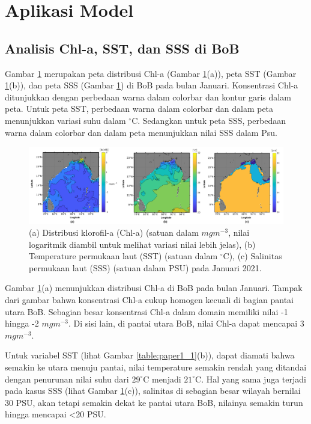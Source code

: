 \section[Aplikasi Model]{Aplikasi Model}
\begin{spacing}{1.5}
	\vspace{-1pc}
\subsection[Analisis Chl-a, SST, dan SSS di BoB]{Analisis Chl-a, SST, dan SSS di BoB}
	Gambar \ref{fig:paper1_1} merupakan peta distribusi Chl-a (Gambar \ref{fig:paper1_1}(a)), peta SST (Gambar \ref{fig:paper1_1}(b)), dan peta SSS (Gambar \ref{fig:paper1_1}) di BoB pada bulan Januari. Konsentrasi Chl-a ditunjukkan dengan perbedaan warna dalam colorbar dan kontur garis dalam peta. Untuk peta SST, perbedaan warna dalam colorbar dan dalam peta menunjukkan variasi suhu dalam $^\circ$C. Sedangkan untuk peta SSS, perbedaan warna dalam colorbar dan dalam peta menunjukkan nilai SSS dalam Psu.
	
	\begin{figure}[H]
		\centering
		\includegraphics[width=15cm]{contents/final_figure_paper1/gambar_1}
		\caption{(a) Distribusi klorofil-a (Chl-a) (satuan dalam $mgm^{-3}$, nilai logaritmik diambil untuk melihat variasi nilai lebih jelas), (b) Temperature permukaan laut (SST) (satuan dalam $^\circ$C), (c) Salinitas permukaan laut (SSS) (satuan dalam PSU) pada Januari 2021.}
		\label{fig:paper1_1}
	\end{figure}
	Gambar \ref{fig:paper1_1}(a) menunjukkan distribusi Chl-a di BoB pada bulan Januari. Tampak dari gambar bahwa konsentrasi Chl-a cukup homogen kecuali di bagian pantai utara BoB. Sebagian besar konsentrasi Chl-a dalam domain memiliki nilai -1 hingga -2 $mgm^{-3}$. Di sisi lain, di pantai utara BoB, nilai Chl-a dapat mencapai 3 $mgm^{-3}$.
	
	Untuk variabel SST (lihat Gambar \ref{table:paper1_1}(b)), dapat diamati bahwa semakin ke utara menuju pantai, nilai temperature semakin rendah yang ditandai dengan penurunan nilai suhu dari $29^\circ$C menjadi $21^\circ$C. Hal yang sama juga terjadi pada kasus SSS (lihat Gambar \ref{fig:paper1_1}(c)), salinitas di sebagian besar wilayah bernilai 30 PSU, akan tetapi semakin dekat ke pantai utara BoB, nilainya semakin turun hingga mencapai <20 PSU.
	

\end{spacing}
